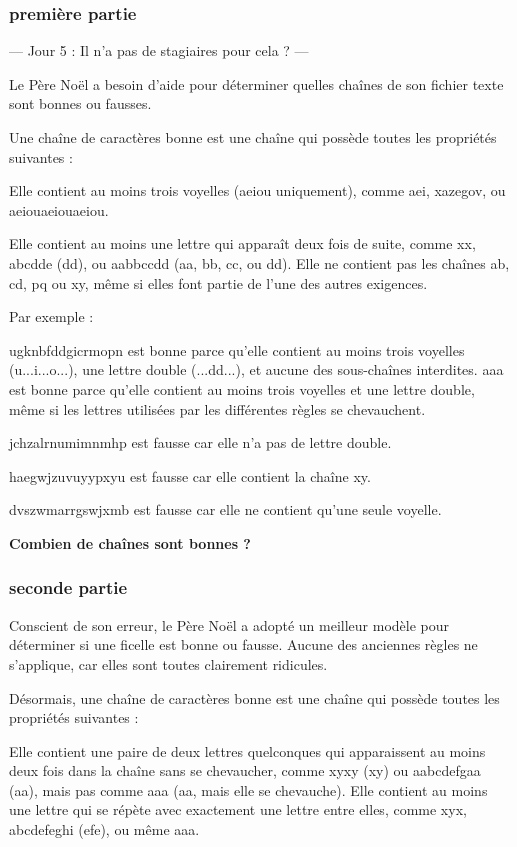 \subsubsection{première partie}

      --- Jour 5 : Il n'a pas de stagiaires pour cela ? ---

Le Père Noël a besoin d'aide pour déterminer quelles chaînes de son fichier texte sont bonnes ou fausses.

Une chaîne de caractères bonne est une chaîne qui possède toutes les propriétés suivantes :

    Elle contient au moins trois voyelles (aeiou uniquement), comme aei, xazegov, ou aeiouaeiouaeiou.
    
    Elle contient au moins une lettre qui apparaît deux fois de suite, comme xx, abcdde (dd), ou aabbccdd (aa, bb, cc, ou dd).
    Elle ne contient pas les chaînes ab, cd, pq ou xy, même si elles font partie de l'une des autres exigences.

Par exemple :

    ugknbfddgicrmopn est bonne parce qu'elle contient au moins trois voyelles (u...i...o...), une lettre double (...dd...), et aucune des sous-chaînes interdites.
    aaa est bonne parce qu'elle contient au moins trois voyelles et une lettre double, même si les lettres utilisées par les différentes règles se chevauchent.
    
    jchzalrnumimnmhp est fausse car elle n'a pas de lettre double.
    
    haegwjzuvuyypxyu est fausse car elle contient la chaîne xy.
    
    dvszwmarrgswjxmb est fausse car elle ne contient qu'une seule voyelle.

\textbf{Combien de chaînes sont bonnes ?}

\subsubsection{seconde partie}
Conscient de son erreur, le Père Noël a adopté un meilleur modèle pour déterminer si une ficelle est bonne ou fausse. Aucune des anciennes règles ne s'applique, car elles sont toutes clairement ridicules.

Désormais, une chaîne de caractères bonne est une chaîne qui possède toutes les propriétés suivantes :

    Elle contient une paire de deux lettres quelconques qui apparaissent au moins deux fois dans la chaîne sans se chevaucher, comme xyxy (xy) ou aabcdefgaa (aa), mais pas comme aaa (aa, mais elle se chevauche).
    Elle contient au moins une lettre qui se répète avec exactement une lettre entre elles, comme xyx, abcdefeghi (efe), ou même aaa.

